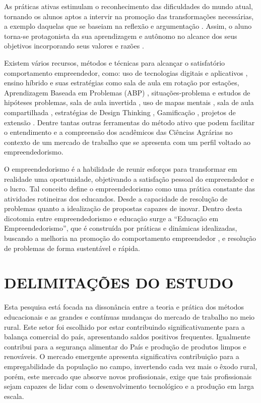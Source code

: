 As práticas ativas estimulam o reconhecimento das dificuldades do mundo atual, tornando os alunos aptos a intervir na promoção das transformações necessárias, a exemplo daquelas que se baseiam na reflexão e argumentação \cite{bezanilla_methodologies_2019}. Assim, o aluno torna-se protagonista da sua aprendizagem e autônomo no alcance dos seus objetivos incorporando seus valores e razões \cite{rubel_student_2016}.

Existem vários recursos, métodos e técnicas para alcançar o satisfatório comportamento empreendedor, como: uso de tecnologias digitais e aplicativos \cite{pereira_use_2020}, ensino híbrido e suas estratégias como sala de aula em rotação por estações, Aprendizagem Baseada em Problemas (ABP) \cite{souza_aprendizagem_2015}, situações-problema e estudos de hipóteses problemas, sala de aula invertida \cite{junior_sala_2016,branco_sala_2016}, uso de mapas mentais \cite{junior_percepcao_2018}, sala de aula compartilhada \cite{strack_por_2009}, estratégias de Design Thinking \cite{andrews_circular_2015}, Gamificação \cite{ogawa_avaliacao_2016}, projetos de extensão \cite{santos_projeto_2019}. Dentre tantas outras ferramentas do método ativo que podem facilitar o entendimento e a compreensão dos acadêmicos das Ciências Agrárias no contexto de um mercado de trabalho que se apresenta com um perfil voltado ao empreendedorismo.

O empreendedorismo é a habilidade de reunir esforços para transformar em realidade uma oportunidade, objetivando a satisfação pessoal do empreendedor e o lucro. Tal conceito define o empreendedorismo como uma prática constante das atividades rotineiras dos educandos. Desde a capacidade de resolução de problemas quanto a idealização de propostas capazes de inovar. Dentro desta dicotomia entre empreendedorismo e educação surge a “Educação em Empreendedorismo”, que é construída por práticas e dinâmicas idealizadas, buscando a melhoria na promoção do comportamento empreendedor \cite{martins_educacao_2016, morais_empreendedorismo_2018}, e resolução de problemas de forma sustentável e rápida.

\section{DELIMITAÇÕES DO ESTUDO}

Esta pesquisa está focada na dissonância entre a teoria e prática dos métodos educacionais e as grandes e contínuas mudanças do mercado de trabalho no meio rural. Este setor foi escolhido por estar contribuindo significativamente para a balança comercial do país, apresentando saldos positivos frequentes. Igualmente contribui para a segurança alimentar do País e produção de produtos limpos e renováveis. O mercado emergente apresenta significativa contribuição para a empregabilidade da população no campo, invertendo cada vez mais o êxodo rural, porém, este mercado que absorve novos profissionais, exige que tais profissionais sejam capazes de lidar com o desenvolvimento tecnológico e a produção em larga escala. 

